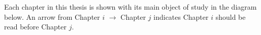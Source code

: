 \documentclass[12pt]{amsart}
\theoremstyle{plain}
\begin{document}
Each chapter in this thesis is shown with its main object of study in the diagram below.
An arrow from Chapter $i$ $\to$ Chapter $j$ indicates Chapter $i$ should be read before Chapter $j$.
\end{document}
